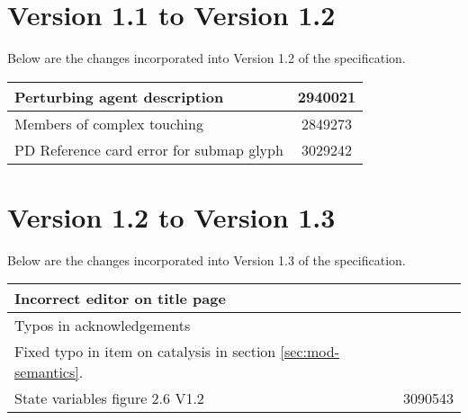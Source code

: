 \section{Version 1.1 to Version 1.2}

Below are the changes incorporated into Version 1.2 of the \SBGNPDLone specification.

\begin{center}
\label{tab:revision history 1.2}
\tablelasttail{\hline}
\begin{supertabular}{|p{12cm}|c|}\hline
Perturbing agent description & 2940021 \\\hline
Members of complex touching & 2849273 \\\hline
PD Reference card error for submap glyph & 3029242 \\\hline
\end{supertabular}
\end{center}

\section{Version 1.2 to Version 1.3}

Below are the changes incorporated into Version 1.3 of the \SBGNPDLone specification.

\begin{center}
\label{tab:revision history 1.3}
\tablelasttail{\hline}
\begin{supertabular}{|p{12cm}|c|}\hline
Incorrect editor on title page & \\\hline
Typos in acknowledgements & \\\hline
Fixed typo in item on catalysis in section \ref{sec:mod-semantics}. & \\\hline
State variables figure 2.6 V1.2 & 3090543 \\\hline\end{supertabular}
\end{center}
